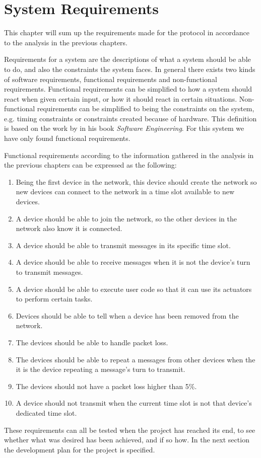 \chapter{System Requirements}\label{requirements}
This chapter will sum up the requirements made for the protocol in accordance to the analysis in the previous chapters.

Requirements for a system are the descriptions of what a system should be able to do, and also the constraints the system faces.
In general there exists two kinds of software requirements, functional requirements and non-functional requirements. 
Functional requirements can be simplified to how a system should react when given certain input, or how it should react in certain situations.
Non-functional requirements can be simplified to being the constraints on the system, e.g. timing constraints or constraints created because of hardware.
This definition is based on the work by \citet[see][chapter 4]{SEBook} in his book \textit{Software Engineering}.
For this system we have only found functional requirements.

Functional requirements according to the information gathered in the analysis in the previous chapters can be expressed as the following: 


\begin{enumerate}[label=\itshape \alph*\upshape)]
    \item Being the first device in the network, this device should create the network so new devices can connect to the network in a time slot available to new devices.
    \item A device should be able to join the network, so the other devices in the network also know it is connected.
    \item A device should be able to transmit messages in its specific time slot.
    \item A device should be able to receive messages when it is not the device's turn to transmit messages.
    \item A device should be able to execute user code so that it can use its actuators to perform certain tasks.
    \item Devices should be able to tell when a device has been removed from the network.
    \item The devices should be able to handle packet loss.
    \item The devices should be able to repeat a messages from other devices when the it is the device repeating a message's turn to transmit.
    \item The devices should not have a packet loss higher than 5\%.
    \item A device should not transmit when the current time slot is not that device's dedicated time slot. 
\end{enumerate}

These requirements can all be tested when the project has reached its end, to see whether what was desired has been achieved, and if so how. 
In the next section the development plan for the project is specified.